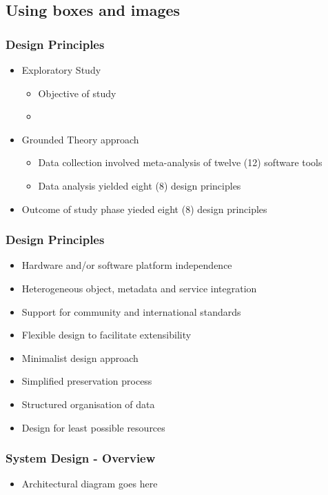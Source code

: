 \documentclass[xcolor=pdftex,t,11pt]{beamer}
\begin{document}
\subsection{Using boxes and images}

\begin{frame}[fragile]
\frametitle{Design Principles}
\begin{itemize}
\item Exploratory Study
\begin{itemize}
\item Objective of study
\item 
\end{itemize}
\item Grounded Theory approach
\begin{itemize}
\item Data collection involved meta-analysis of twelve (12) software tools
\item Data analysis yielded eight (8) design principles
\end{itemize}
\item Outcome of study phase yieded eight (8) design principles
\end{itemize}
\end{frame}

\begin{frame}[fragile]
\frametitle{Design Principles}
\begin{itemize}
\item Hardware and/or software platform independence
\item Heterogeneous object, metadata and service integration
\item Support for community and international standards
\item Flexible design to facilitate extensibility
\item Minimalist design approach
\item Simplified preservation process
\item Structured organisation of data
\item Design for least possible resources
\end{itemize}

\end{frame}


\begin{frame}[fragile]
\frametitle{System Design - Overview}
\begin{itemize}
\item Architectural diagram goes here
\end{itemize}
\begin{figure}
\end{figure}
\end{frame}
\end{document}
